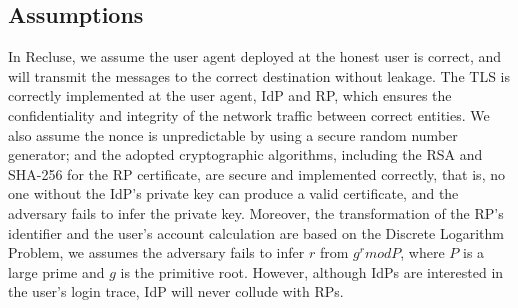 \subsection{Assumptions}
In Recluse, we assume the user agent deployed at the honest user is correct, and will transmit the messages to the correct destination without leakage. The TLS is correctly implemented at the user agent, IdP and RP, which ensures the confidentiality and integrity of the network traffic between correct entities. We also assume the nonce is unpredictable by using  a secure random number generator; and the adopted cryptographic algorithms, including the RSA and SHA-256 for the RP certificate, are secure and implemented correctly, that is, no one without the IdP's private key can produce a valid certificate, and the adversary fails to infer the private key. Moreover, the transformation of the RP's identifier and the user's account calculation are based on the Discrete Logarithm Problem, we assumes the adversary fails to infer $r$ from $g^r mod P$, where $P$ is a large prime and $g$ is the primitive root. However, although IdPs are interested in the user's login trace, IdP will never collude with RPs.







